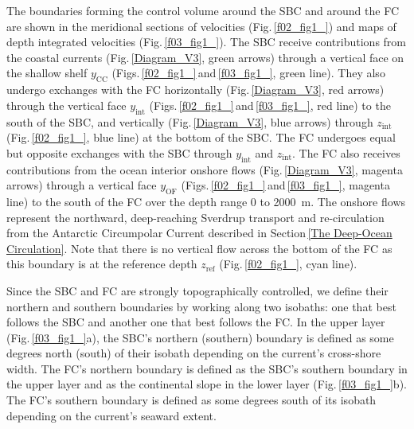 \documentclass[preprint,3p,review,12pt]{elsarticle}
\newcommand{\sub}[1]{_{\text{#1}}}
\begin{document}
The boundaries forming the control volume around the SBC and around the FC are shown in the meridional sections of velocities (Fig.\,\ref{f02_fig1_}) and maps of depth integrated velocities (Fig.\,\ref{f03_fig1_}). The SBC receive contributions from the coastal currents (Fig.\,\ref{Diagram_V3}, green arrows) through a vertical face on the shallow shelf $y\sub{CC}$ (Figs.\,\ref{f02_fig1_}\,and\,\ref{f03_fig1_}, green line). They also undergo exchanges with the FC horizontally (Fig.\,\ref{Diagram_V3}, red arrows) through the vertical face $y\sub{int}$ (Figs.\,\ref{f02_fig1_}\,and\,\ref{f03_fig1_}, red line) to the south of the SBC, and vertically (Fig.\,\ref{Diagram_V3}, blue arrows) through $z\sub{int}$ (Fig.\,\ref{f02_fig1_}, blue line) at the bottom of the SBC\@. The FC undergoes equal but opposite exchanges with the SBC through $y\sub{int}$ and $z\sub{int}$\@. The FC also receives contributions from the ocean interior onshore flows (Fig.\,\ref{Diagram_V3}, magenta arrows) through a vertical face $y\sub{OF}$ (Figs.\,\ref{f02_fig1_}\,and\,\ref{f03_fig1_}, magenta line) to the south of the FC over the depth range 0 to \SI{2000}{\meter}. The onshore flows represent the northward, deep-reaching Sverdrup transport and re-circulation from the Antarctic Circumpolar Current described in Section\,\ref{The Deep-Ocean Circulation}.
Note that there is no vertical flow across the bottom of the FC as this boundary is at the reference depth $z\sub{ref}$ (Fig.\,\ref{f02_fig1_}, cyan line).

Since the SBC and FC are strongly topographically controlled, we define their northern and southern boundaries by working along two isobaths: one that best follows the SBC and another one that best follows the FC\@. In the upper layer (Fig.\,\ref{f03_fig1_}a), the SBC's northern (southern) boundary is defined as some degrees north (south) of their isobath depending on the current's cross-shore width. The FC's northern boundary is defined as the SBC's southern boundary in the upper layer and as the continental slope in the lower layer (Fig.\,\ref{f03_fig1_}b). The FC's southern boundary is defined as some degrees south of its isobath depending on the current's seaward extent. 
\end{document}
